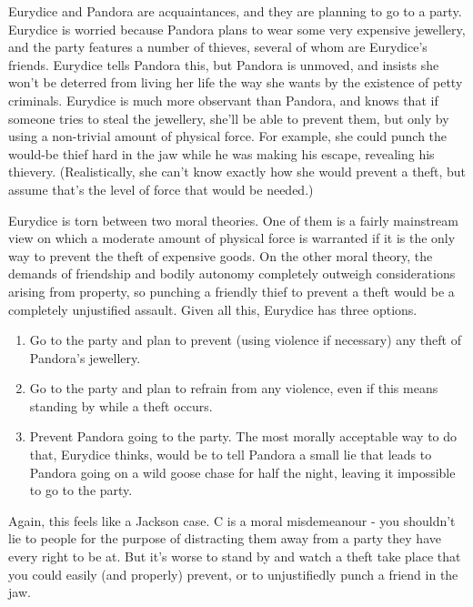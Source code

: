 \gls{Eurydice} and \gls{Pandora} are acquaintances, and they are planning to go to a party. \gls{Eurydice} is worried because \gls{Pandora} plans to wear some very expensive jewellery, and the party features a number of thieves, several of whom are \gls{Eurydice}'s friends. \gls{Eurydice} tells \gls{Pandora} this, but \gls{Pandora} is unmoved, and insists she won't be deterred from living her life the way she wants by the existence of petty criminals. \gls{Eurydice} is much more observant than \gls{Pandora}, and knows that if someone tries to steal the jewellery, she'll be able to prevent them, but only by using a non-trivial amount of physical force. For example, she could punch the would-be thief hard in the jaw while he was making his escape, revealing his thievery. (Realistically, she can't know exactly how she would prevent a theft, but assume that's the level of force that would be needed.)

\gls{Eurydice} is torn between two moral theories. One of them is a fairly mainstream view on which a moderate amount of physical force is warranted if it is the only way to prevent the theft of expensive goods. On the other moral theory, the demands of friendship and bodily autonomy completely outweigh considerations arising from property, so punching a friendly thief to prevent a theft would be a completely unjustified assault. Given all this, \gls{Eurydice} has three options.

\renewcommand{\labelenumi}{\Alph{enumi}.}

\begin{enumerate}
\item{} Go to the party and plan to prevent (using violence if necessary) any theft of \gls{Pandora}'s jewellery.

\item{} Go to the party and plan to refrain from any violence, even if this means standing by while a theft occurs.

\item{} Prevent \gls{Pandora} going to the party. The most morally acceptable way to do that, \gls{Eurydice} thinks, would be to tell \gls{Pandora} a small lie that leads to \gls{Pandora} going on a wild goose chase for half the night, leaving it impossible to go to the party.

\end{enumerate}
\renewcommand{\labelenumi}{\arabic{enumi}.} Again, this feels like a Jackson case. C is a moral misdemeanour - you shouldn't lie to people for the purpose of distracting them away from a party they have every right to be at. But it's worse to stand by and watch a theft take place that you could easily (and properly) prevent, or to unjustifiedly punch a friend in the jaw.

